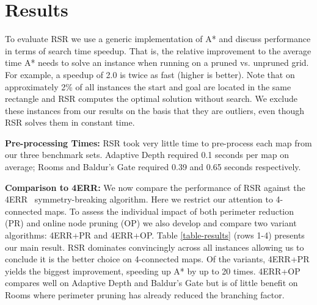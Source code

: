 \section{Results}
\label{sec-results}
To evaluate RSR we use a generic implementation of A* and discuss performance 
in terms of search time speedup. That is, the relative improvement to the average 
time A* needs to solve an instance when running on a pruned  vs. unpruned grid.
For example, a speedup of 2.0 is twice as fast (higher is better).
Note that on approximately 2\% of all instances the start and goal are located
in the same rectangle and RSR computes the optimal solution without
search.  We exclude these instances from our results on the basis that they are 
outliers, even though RSR solves them in constant time.



\textbf{Pre-processing Times: } 
RSR took very little time to pre-process each map from our three
benchmark sets. Adaptive Depth required 0.1
seconds per map on average; Rooms and Baldur's Gate required 0.39 and 0.65 seconds
respectively.


\textbf{Comparison to 4ERR: }
We now compare the performance of RSR against the 4ERR~\cite{harabor10} symmetry-breaking
algorithm. Here we restrict our attention to 4-connected maps.  To
assess the individual impact of both perimeter reduction (PR) and online node
pruning (OP) we also develop and compare two variant algorithms: 4ERR+PR and
4ERR+OP. 
Table \ref{table-results} (rows 1-4) presents our main result. RSR dominates
convincingly across all instances allowing us to conclude it is the better
choice on 4-connected maps. 
Of the variants, 4ERR+PR yields the biggest improvement, speeding up A* by up to 20 times.
4ERR+OP compares well on Adaptive Depth and Baldur's Gate but is of little benefit on 
Rooms where perimeter pruning has already reduced the branching factor.

%

